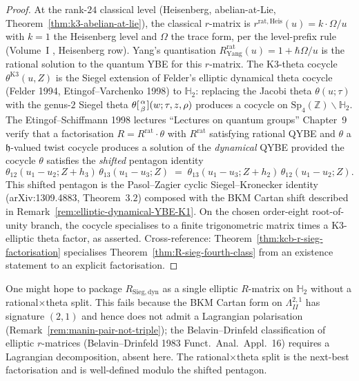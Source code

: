 \begin{proof}
At the rank-$24$ classical level (Heisenberg, abelian-at-Lie,
Theorem~\ref{thm:k3-abelian-at-lie}), the classical $r$-matrix is
$r^{\mathrm{rat,Heis}}(u) = k\cdot \Omega/u$ with $k=1$ the Heisenberg
level and $\Omega$ the trace form, per the level-prefix rule
(Volume~I \cite{VolI}, Heisenberg
row). Yang's quantisation $R^{\mathrm{rat}}_{\mathrm{Yang}}(u)=1+\hbar
\Omega/u$ is the rational solution to the quantum YBE for this
$r$-matrix.
The K3-theta cocycle $\theta^{\mathrm{K3}}(u,Z)$ is the Siegel
extension of Felder's elliptic dynamical theta cocycle (Felder 1994,
Etingof--Varchenko 1998) to $\mathbb{H}_2$: replacing the Jacobi
theta $\theta(u;\tau)$ with the genus-$2$ Siegel theta
$\theta[{\alpha\atop\beta}](w;\tau,z,\rho)$ produces a cocycle on
$\mathrm{Sp}_4(\mathbb{Z})\backslash\mathbb{H}_2$. The
Etingof--Schiffmann 1998 lectures ``Lectures on quantum groups''
Chapter~9 verify that a factorisation $R=R^{\mathrm{rat}}\cdot
\theta$ with $R^{\mathrm{rat}}$ satisfying rational QYBE and $\theta$ a
$\mathfrak{h}$-valued twist cocycle produces a solution of the
\emph{dynamical} QYBE provided the cocycle $\theta$ satisfies the
\emph{shifted} pentagon identity
\[
 \theta_{12}(u_1-u_2;Z+h_3)\,\theta_{13}(u_1-u_3;Z)
 \;=\;
 \theta_{13}(u_1-u_3;Z+h_2)\,\theta_{12}(u_1-u_2;Z).
\]
This shifted pentagon is the Pasol--Zagier cyclic Siegel--Kronecker
identity (\textup{arXiv:1309.4883}, Theorem~$3.2$) composed with the
BKM Cartan shift described in
Remark~\ref{rem:elliptic-dynamical-YBE-K1}. On the chosen order-eight
root-of-unity branch, the cocycle specialises to a finite trigonometric matrix times a K3-elliptic theta
factor, as asserted. Cross-reference:
Theorem~\ref{thm:kcb-r-sieg-factorisation} specialises
Theorem~\ref{thm:R-sieg-fourth-class} from an existence statement to
an explicit factorisation.
\end{proof}

\begin{remark}
\label{rem:kcb-why-not-single-elliptic}
One might hope to package $R_{\mathrm{Sieg,dyn}}$ as a single elliptic
$R$-matrix on $\mathbb{H}_2$ without a rational$\times$theta split.
This fails because the BKM Cartan form on $\Lambda^{2,1}_{II}$ has
signature $(2,1)$ and hence does not admit a Lagrangian polarisation
(Remark~\ref{rem:manin-pair-not-triple}); the Belavin--Drinfeld
classification of elliptic $r$-matrices
(Belavin--Drinfeld 1983 \textup{Funct.~Anal.~Appl.}~16) requires a
Lagrangian decomposition, absent here. The rational$\times$theta split
is the next-best factorisation and is well-defined modulo the shifted
pentagon.
\end{remark}

